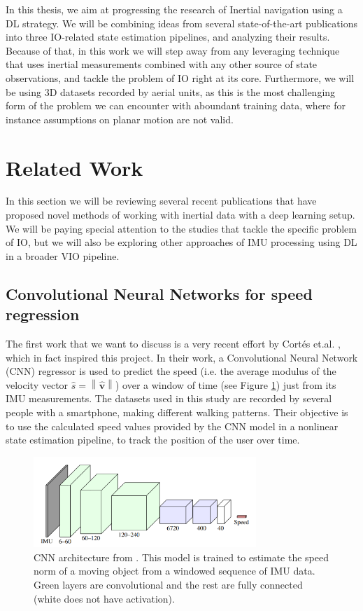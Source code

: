 In this thesis, we aim at progressing the research of Inertial navigation using a DL strategy. 
We will be combining ideas from several state-of-the-art publications into three IO-related state estimation pipelines, and analyzing their results. 
Because of that, in this work we will step away from any leveraging technique that uses inertial measurements combined with any other source of state observations, and tackle the problem of IO right at its core.
Furthermore, we will be using 3D datasets recorded by aerial units, as this is the most challenging form of the problem we can encounter with aboundant training data, where for instance assumptions on planar motion are not valid.


\section{Related Work}\label{sec:related_work}

In this section we will be reviewing several recent publications that have proposed novel methods of working with inertial data with a deep learning setup. 
We will be paying special attention to the studies that tackle the specific problem of IO, but we will also be exploring other approaches of IMU processing using DL in a broader VIO pipeline.

\subsection{Convolutional Neural Networks for speed regression}\label{sec:speed_reg}
The first work that we want to discuss is a very recent effort by Cort\'es et.al.  \cite{DBLP:journals/corr/abs-1808-03485}, which in fact inspired this project. 
In their work, a Convolutional Neural Network (CNN) regressor is used to predict the speed (i.e. the average modulus of the velocity vector $\hat{s} = \left \| \mathbf{\hat{v}}\right \|$) over a window of time (see Figure \ref{fig:original_speed_net}) just from its IMU measurements. 
The datasets used in this study are recorded by several people with a smartphone, making different walking patterns.
Their objective is to use the calculated speed values provided by the CNN model in a nonlinear state estimation pipeline, to track the position of the user over time. 

\begin{figure}[h]
   \centering
   \includegraphics[width=0.75\textwidth]{thesis_template/img/cortes_cnn_architecture.png}
   \caption{CNN architecture from \cite{DBLP:journals/corr/abs-1808-03485}. This model is trained to estimate the speed norm of a moving object from a windowed sequence of IMU data. 
   Green layers are convolutional and the rest are fully connected (white does not have activation).}
   \label{fig:original_speed_net}
\end{figure}


